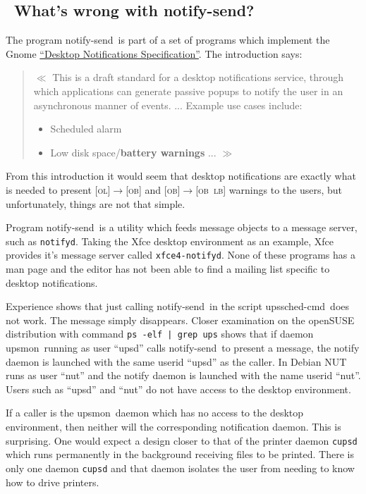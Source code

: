 \documentclass[12pt]{article}
\newlength{\headersep}\setlength{\headersep}{3mm}
\newcommand{\Hsep}{\hspace{\headersep}}
\newcommand{\upsmon}{\mbox{\textcolor{MONCOLOUR}{upsmon}}}
\newcommand{\upsschedcmd}{\mbox{\textcolor{CMDCOLOUR}{upssched-cmd}}}
\newcommand{\notifysend}{\mbox{\textcolor{NOTIFYCOLOUR}{notify-send}}}
\newcommand{\LB}{\textcolor{UPSDCOLOUR}{\textsc{lb}}}
\newcommand{\OB}{\textcolor{UPSDCOLOUR}{\textsc{ob}}}
\newcommand{\OL}{\textcolor{UPSDCOLOUR}{\textsc{ol}}}
\newcommand{\status}[1]{\textcolor{UPSDCOLOUR}{[{#1}]}}
\newcommand{\statuschange}[2]{\status{#1}{\allowbreak}\textcolor{UPSDCOLOUR}{$\rightarrow$}{\allowbreak}\status{#2}}
\newcommand{\ul}{\begin{itemize}%
   \setlength{\itemsep}{0em}}
\newcommand{\eul}{\end{itemize}}
\newcommand{\li}{\item}                 %
\begin{document}
\subsection{\Hsep\ What's wrong with \notifysend?}\label{section:notifysend.intro}

The program \notifysend\ is part of a set of programs which implement the
Gnome \href{https://developer.gnome.org/notification-spec/}{``Desktop
  Notifications Specification''}.   The introduction says:

\begin{quotation}
$\ll$ This is a draft standard for a desktop notifications service, through
  which applications can generate passive popups to notify the user in an
  asynchronous manner of events. ...  Example use cases include:

\ul
\li Scheduled alarm
\li Low disk space/\textbf{battery warnings} ... $\gg$
\eul
\end{quotation}

From this introduction it would seem that desktop notifications are exactly
what is needed to present \statuschange{\OL}{\OB} and
\statuschange{\OB}{\OB\ \LB} warnings to the users, but unfortunately, things
are not that simple.

Program \notifysend\ is a utility which feeds message objects to a message
server, such as \texttt{notifyd}.  Taking the Xfce desktop environment as an
example, Xfce provides it's message server called \texttt{xfce4-notifyd}.
None of these programs has a man page and the editor has not been able to find
a mailing list specific to desktop notifications.

Experience shows that just calling \notifysend\ in the script
\upsschedcmd\ does not work.  The message simply disappears.  Closer
examination on the openSUSE distribution with command \texttt{ps -elf | grep
ups} shows that if daemon \upsmon\ running as user ``upsd'' calls
\notifysend\ to present a message, the notify daemon is launched with the same
userid ``upsd'' as the caller.  In Debian NUT runs as user ``nut'' and the
notify daemon is launched with the name userid ``nut''.
Users such as ``upsd'' and ``nut'' do not have access to the desktop environment.
 
If a caller is the \upsmon\ daemon which has no access to the desktop
environment, then neither will the corresponding notification daemon.  This is
surprising.  One would expect a design closer to that of the printer daemon
\texttt{cupsd} which runs permanently in the background receiving files to be
printed.  There is only one daemon \texttt{cupsd} and that daemon isolates the
user from needing to know how to drive printers.
\end{document}
